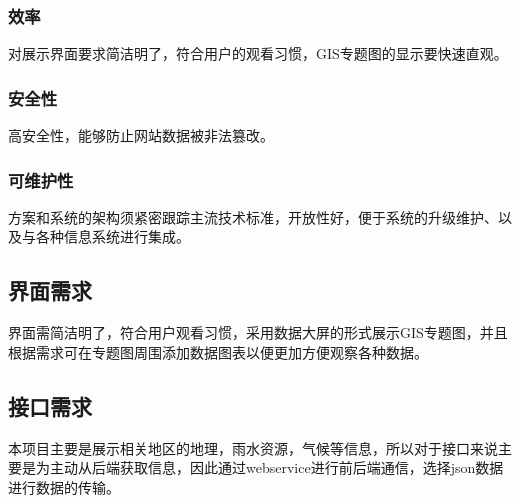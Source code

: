 \subsubsection{效率}
对展示界面要求简洁明了，符合用户的观看习惯，GIS专题图的显示要快速直观。
\subsubsection{安全性}
高安全性，能够防止网站数据被非法篡改。
\subsubsection{可维护性}
方案和系统的架构须紧密跟踪主流技术标准，开放性好，便于系统的升级维护、以及与各种信息系统进行集成。
\subsection{界面需求}
界面需简洁明了，符合用户观看习惯，采用数据大屏的形式展示GIS专题图，并且根据需求可在专题图周围添加数据图表以便更加方便观察各种数据。
\subsection{接口需求}
本项目主要是展示相关地区的地理，雨水资源，气候等信息，所以对于接口来说主要是为主动从后端获取信息，因此通过webservice进行前后端通信，选择json数据进行数据的传输。





